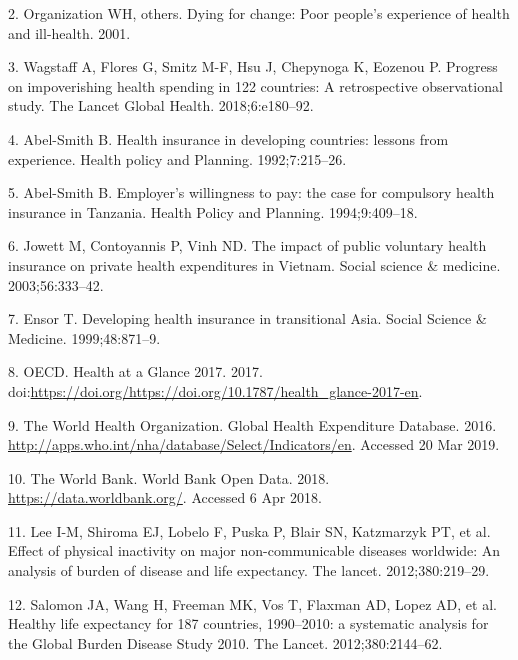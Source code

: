 \documentclass[]{elsarticle} %
\begin{document}
\leavevmode\hypertarget{ref-world2001dying}{}%
2. Organization WH, others. Dying for change: Poor people's experience of health and ill-health. 2001.

\leavevmode\hypertarget{ref-wagstaff2018progress}{}%
3. Wagstaff A, Flores G, Smitz M-F, Hsu J, Chepynoga K, Eozenou P. Progress on impoverishing health spending in 122 countries: A retrospective observational study. The Lancet Global Health. 2018;6:e180--92.

\leavevmode\hypertarget{ref-abel1992health}{}%
4. Abel-Smith B. Health insurance in developing countries: lessons from experience. Health policy and Planning. 1992;7:215--26.

\leavevmode\hypertarget{ref-abel1994employer}{}%
5. Abel-Smith B. Employer's willingness to pay: the case for compulsory health insurance in Tanzania. Health Policy and Planning. 1994;9:409--18.

\leavevmode\hypertarget{ref-jowett2003impact}{}%
6. Jowett M, Contoyannis P, Vinh ND. The impact of public voluntary health insurance on private health expenditures in Vietnam. Social science \& medicine. 2003;56:333--42.

\leavevmode\hypertarget{ref-ensor1999developing}{}%
7. Ensor T. Developing health insurance in transitional Asia. Social Science \& Medicine. 1999;48:871--9.

\leavevmode\hypertarget{ref-healthglance2017}{}%
8. OECD. Health at a Glance 2017. 2017. doi:\href{https://doi.org/https://doi.org/https://doi.org/10.1787/health_glance-2017-en}{https://doi.org/https://doi.org/10.1787/health\_glance-2017-en}.

\leavevmode\hypertarget{ref-WHOdata}{}%
9. The World Health Organization. Global Health Expenditure Database. 2016. \url{http://apps.who.int/nha/database/Select/Indicators/en}. Accessed 20 Mar 2019.

\leavevmode\hypertarget{ref-worldbank}{}%
10. The World Bank. World Bank Open Data. 2018. \url{https://data.worldbank.org/}. Accessed 6 Apr 2018.

\leavevmode\hypertarget{ref-lee2012effect}{}%
11. Lee I-M, Shiroma EJ, Lobelo F, Puska P, Blair SN, Katzmarzyk PT, et al. Effect of physical inactivity on major non-communicable diseases worldwide: An analysis of burden of disease and life expectancy. The lancet. 2012;380:219--29.

\leavevmode\hypertarget{ref-salomon2012healthy}{}%
12. Salomon JA, Wang H, Freeman MK, Vos T, Flaxman AD, Lopez AD, et al. Healthy life expectancy for 187 countries, 1990--2010: a systematic analysis for the Global Burden Disease Study 2010. The Lancet. 2012;380:2144--62.
\end{document}
